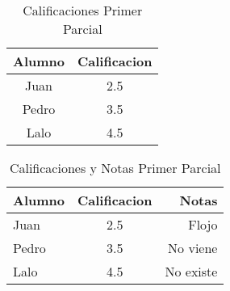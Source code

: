 \documentclass[12pt]{book}
\begin{document}
 \begin{table}
	\begin{tabular}{|c|c|}
	\hline
	Alumno & Calificacion \\
	\hline
	Juan & 2.5 \\
	Pedro & 3.5 \\
	Lalo & 4.5 \\
	\hline
	\end{tabular}
\caption{Calificaciones Primer Parcial}
\label{TablaCalifs1} \end{table}
\begin{table}
	\begin{tabular}{|l|c|r|}
	\hline
	Alumno & Calificacion & Notas\\
	\hline
	Juan & 2.5 & Flojo\\
	Pedro & 3.5 & No viene\\
	Lalo & 4.5 & No existe\\
	\hline
	\end{tabular}
\caption{Calificaciones y Notas Primer Parcial}
\label{TablaCalifs2} \end{table}
\end{document}
